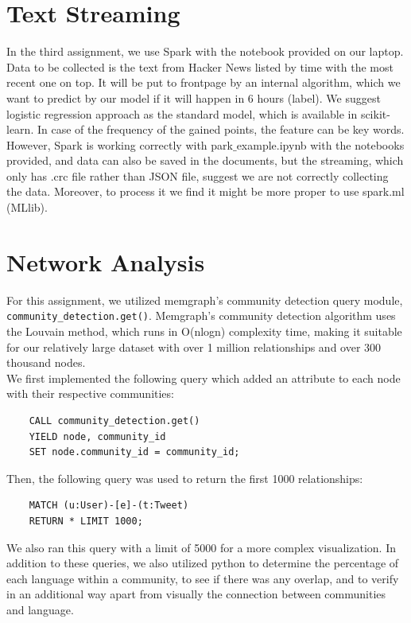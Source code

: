 \documentclass{article}
\begin{document}
\section{Text Streaming}
In the third assignment, we use Spark with the notebook provided on our laptop. Data to be collected is the text from Hacker News listed by time with the most recent one on top. It will be put to frontpage by an internal algorithm, which we want to predict by our model if it will happen in 6 hours (label). We suggest logistic regression approach as the standard model, which is available in scikit-learn. In case of the frequency of the gained points, the feature can be key words.\\
However, Spark is working correctly with park$\_$example.ipynb with the notebooks provided, and data can also be saved in the documents, but the streaming, which only has .crc file rather than JSON file, suggest we are not correctly collecting the data. Moreover, to process it we find it might be more proper to use spark.ml (MLlib). 

\section{Network Analysis}
For this assignment, we utilized memgraph's community detection query module, \verb|community_detection.get()|. Memgraph's community detection algorithm uses the Louvain method, which runs in O(nlogn) complexity time, making it suitable for our relatively large dataset with over 1 million relationships and over 300 thousand nodes. \\

We first implemented the following query which added an attribute to each node with their respective communities:
\begin{verbatim}
    CALL community_detection.get()
    YIELD node, community_id
    SET node.community_id = community_id;
\end{verbatim}
Then, the following query was used to return the first 1000 relationships:
\begin{verbatim}
    MATCH (u:User)-[e]-(t:Tweet)
    RETURN * LIMIT 1000;
\end{verbatim}
We also ran this query with a limit of 5000 for a more complex visualization. In addition to these queries, we also utilized python to determine the percentage of each language within a community, to see if there was any overlap, and to verify in an additional way apart from visually the connection between communities and language. 
\end{document}
